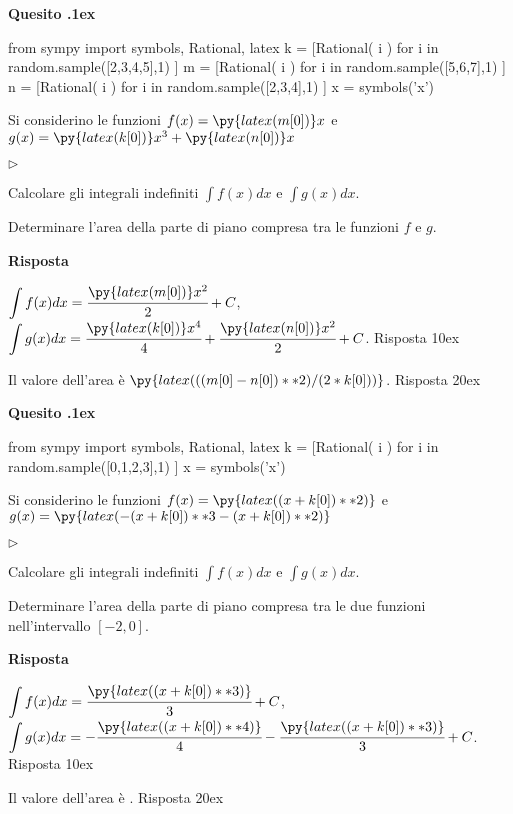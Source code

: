 \documentclass[11pt,twoside,a4paper]{article}
\newcommand{\mylabel}[1]{#1\hfill}
\renewenvironment{itemize}
  {\begin{list}{$\triangleright$}{%
   \setlength{\parskip}{0mm}
   \setlength{\topsep}{.4\baselineskip}
   \setlength{\rightmargin}{0mm}
   \setlength{\listparindent}{0mm}
   \setlength{\itemindent}{0mm}
   \setlength{\labelwidth}{2ex}
   \setlength{\itemsep}{.4\baselineskip}
   \setlength{\parsep}{0mm}
   \setlength{\partopsep}{0mm}
   \setlength{\labelsep}{1ex}
   \setlength{\leftmargin}{\labelwidth+\labelsep}
   \let\makelabel\mylabel}}{%
   \end{list}\vspace*{-1.3mm}}
\newcounter{quesito}
\newenvironment{question}{\bigskip\addtocounter{quesito}{1}\bigskip\bigskip\par\textbf{Quesito \thequesito.\kern1ex}}{\vspace{\parskip}}
\newenvironment{answer}{\par\textbf{Risposta\quad}}{\vspace{\parskip}}
\begin{document}
\begin{question}
\begin{pycode}
from sympy import symbols, Rational, latex
k = [Rational( i ) for i in random.sample([2,3,4,5],1) ]
m = [Rational( i ) for i in random.sample([5,6,7],1) ]
n = [Rational( i ) for i in random.sample([2,3,4],1) ]
x = symbols('x')
\end{pycode}
Si considerino le funzioni $f(x) = \py{latex(m[0])} x$ e $g(x) = \py{latex(k[0])} x^3 + \py{latex(n[0])} x$
\begin{itemize}
\item[1.] Calcolare gli integrali indefiniti $\displaystyle \int f(x) dx$ e $\displaystyle \int g(x) dx$.
\item[2.] Determinare l'area della parte di piano compresa tra le funzioni $f$ e $g$.
\end{itemize}
\begin{answer}

{\color{blue} $\displaystyle \int f(x) dx = \cfrac{\py{latex(m[0])} x^2}{2} + C$, $\displaystyle \int g(x) dx = \cfrac{\py{latex(k[0])}x^4}{4} +\cfrac{\py{latex(n[0])} x^2}{2} + C$. 
\hfill Risposta 1\kern0ex}

\smallskip
{\color{blue} Il valore dell'area è $\py{latex(((m[0]-n[0])**2)/(2*k[0]))}$.
\hfill Risposta 2\kern0ex}

\end{answer}
\end{question}
\begin{question}
\begin{pycode}
from sympy import symbols, Rational, latex
k = [Rational( i ) for i in random.sample([0,1,2,3],1) ]
x = symbols('x')
\end{pycode}
Si considerino le funzioni $f(x) = \py{latex((x+k[0])**2)}$ e $g(x) =  \py{latex(-(x+k[0])**3-(x+k[0])**2)}$
\begin{itemize}
\item[1.] Calcolare gli integrali indefiniti $\displaystyle \int f(x) dx$ e $\displaystyle \int g(x) dx$.
\item[2.] Determinare l'area della parte di piano compresa tra le due funzioni nell'intervallo $[-2, 0]$.
\end{itemize}
\begin{answer}

{\color{blue} $\displaystyle \int f(x) dx = \cfrac{\py{latex((x+k[0])**3)}}{3} + C$, $\displaystyle \int g(x) dx = -\cfrac{\py{latex((x+k[0])**4)}}{4} -\cfrac{\py{latex((x+k[0])**3)}}{3} + C$. 
\hfill Risposta 1\kern0ex}

\smallskip
{\color{blue} Il valore dell'area è .
\hfill Risposta 2\kern0ex}

\end{answer}
\end{question}
\end{document}
